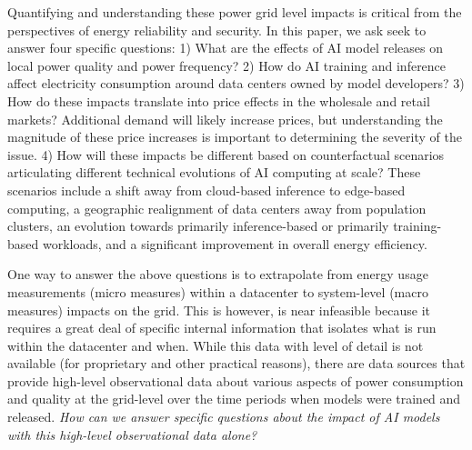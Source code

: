 \documentclass[sigconf,authordraft]{acmart}
\newcommand{\nb}[1]{\textcolor{blue}{NB[#1]}}
\begin{document}
Quantifying and understanding these power grid level impacts is critical from the perspectives of energy reliability and security. In this paper, we ask seek to answer four specific questions: 1) What are the effects of AI model releases on local power quality and power frequency? 2) How do AI training and inference affect electricity consumption around data centers owned by model developers? 3) How do these impacts translate into price effects in the wholesale and retail markets? Additional demand will likely increase prices, but understanding the magnitude of these price increases is important to determining the severity of the issue. 4) How will these impacts be different based on counterfactual scenarios articulating different technical evolutions of AI computing at scale? These scenarios include a shift away from cloud-based inference to edge-based computing, a geographic realignment of data centers away from population clusters, an evolution towards primarily inference-based or primarily training-based workloads, and a significant improvement in overall energy efficiency.

One way to answer the above questions is to extrapolate from energy usage measurements (micro measures) within a datacenter to system-level (macro measures) impacts on the grid. This is however, is near infeasible because it requires a great deal of specific internal information that isolates what is run within the datacenter and when. While this data with level of detail is not available (for proprietary and other practical reasons), there are data sources that provide high-level observational data about various aspects of power consumption and quality at the grid-level over the time periods when models were trained and released. \emph{How can we answer specific questions about the impact of AI models with this high-level observational data alone?}
\end{document}
